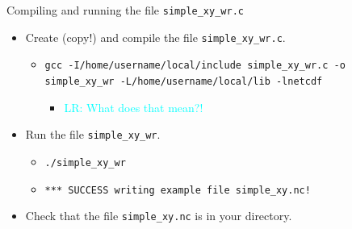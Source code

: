 \documentclass[compress,11pt,xcolor=svgnames,aspectratio=169]{beamer}
\newcommand{\lr}[1]{\textcolor{cyan}{LR: #1}}
\begin{document}
\begin{frame}[fragile]{Compiling and running the file \texttt{simple\_xy\_wr.c}}

\begin{itemize}
\setlength\itemsep{0.6cm}

  \item Create (copy!) and compile the file \verb|simple_xy_wr.c|.

    \begin{itemize}
      \item {\tiny \verb|gcc -I/home/username/local/include simple_xy_wr.c -o simple_xy_wr -L/home/username/local/lib -lnetcdf|}
        \begin{itemize}
          \item \lr{What does that mean?!}
        \end{itemize}
    \end{itemize}

  \item Run the file \verb|simple_xy_wr|.

      \begin{itemize}

        \item {\tiny \verb|./simple_xy_wr|}\\

        \item {\tiny \verb|*** SUCCESS writing example file simple_xy.nc!|}\\[0.5cm]

      \end{itemize}

  \item Check that the file \verb|simple_xy.nc| is in your directory.

\end{itemize}

\end{frame}
\end{document}
